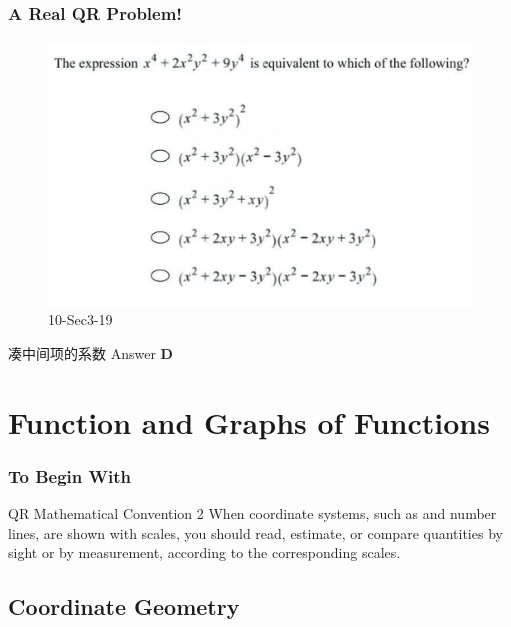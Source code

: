 \documentclass[
	11pt, %
	handout,
]{beamer}
\begin{document}
\begin{frame}
	\frametitle{A Real QR Problem!}
	\framesubtitle{}
	\begin{figure}
		\includegraphics[width=0.7\linewidth]{Algebra_Expression_Example_Question1.png}
		\caption{10-Sec3-19}
	\end{figure}
	\pause
 凑中间项的系数
\pause
\bigskip
Answer \textbf{D } 
\end{frame}



\section{Function and Graphs of Functions}


\begin{frame}
	\frametitle{To Begin With}
	\begin{block}{QR Mathematical Convention 2 }
		When coordinate systems, such as and number lines, are
shown with scales, you should read, estimate, or compare quantities by
sight or by measurement, \alert{according to the corresponding scales}.
	\end{block}
\end{frame}


\subsection{Coordinate Geometry}
\end{document}

